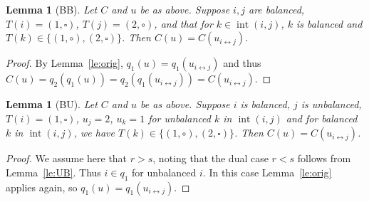 \documentclass[reqno]{amsart}
\newcommand{\0}{\phantom{c}}
\DeclareMathOperator{\inter}{int} %
\theoremstyle{plain}
\newtheorem{lemma}[thm]{Lemma}
\theoremstyle{definition}
\numberwithin{equation}{section}
\begin{document}
\begin{lemma}[BB]
\label{le:BB}
  Let $C$ and $u$ be as above. Suppose $i,j$ are balanced, $T(i) = (1,\square)$, $T(j) = (2,\circ)$, and that for $k\in\inter(i,j)$, $k$ is balanced and $T(k) \in \{(1,\circ),(2,\square)\}$. Then $C(u) = C(u_{i \leftrightarrow j})$.
\end{lemma}
\begin{proof}
  By Lemma~\ref{le:orig}, $q_1(u) = q_1(u_{i\leftrightarrow j})$ and thus $C(u) = q_2(q_1(u)) = q_2(q_1(u_{i\leftrightarrow j})) = C(u_{i\leftrightarrow j})$.
\end{proof}

\begin{lemma}[BU]
\label{le:BU}
  Let $C$ and $u$ be as above. Suppose $i$ is balanced, $j$ is unbalanced, $T(i) = (1,\square)$, $u_j = 2$, $u_k = 1$ for unbalanced $k$ in $\inter (i,j)$ and for balanced $k$ in $\inter(i,j)$, we have $T(k) \in \{(1,\circ),(2,\square)\}$. Then $C(u) = C(u_{i \leftrightarrow j})$.
 \end{lemma} 
\begin{proof}
  We assume here that $r > s$, noting that the dual case $r < s$ follows from Lemma~\ref{le:UB}. Thus $i \in q_1$ for unbalanced $i$. In this case Lemma~\ref{le:orig} applies again, so $q_1(u) = q_1(u_{i\leftrightarrow j})$.
\end{proof}
\end{document}
